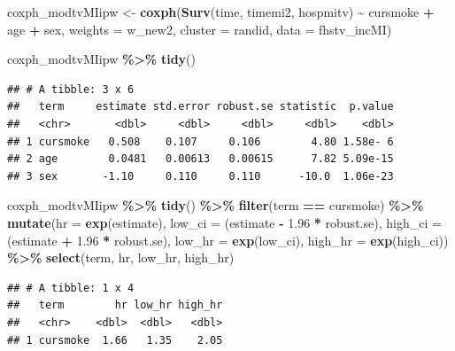 \documentclass[
]{book}
\newenvironment{Shaded}{\begin{snugshade}}{\end{snugshade}}
\newcommand{\AttributeTok}[1]{\textcolor[rgb]{0.13,0.29,0.53}{#1}}
\newcommand{\FloatTok}[1]{\textcolor[rgb]{0.00,0.00,0.81}{#1}}
\newcommand{\FunctionTok}[1]{\textcolor[rgb]{0.13,0.29,0.53}{\textbf{#1}}}
\newcommand{\NormalTok}[1]{#1}
\newcommand{\OtherTok}[1]{\textcolor[rgb]{0.56,0.35,0.01}{#1}}
\newcommand{\SpecialCharTok}[1]{\textcolor[rgb]{0.81,0.36,0.00}{\textbf{#1}}}
\newcommand{\StringTok}[1]{\textcolor[rgb]{0.31,0.60,0.02}{#1}}
\begin{document}
\begin{Shaded}
\begin{Highlighting}[]
\NormalTok{coxph\_modtvMIipw }\OtherTok{\textless{}{-}} \FunctionTok{coxph}\NormalTok{(}\FunctionTok{Surv}\NormalTok{(time, timemi2, hospmitv) }\SpecialCharTok{\textasciitilde{}} 
\NormalTok{                                cursmoke }\SpecialCharTok{+}\NormalTok{ age }\SpecialCharTok{+}\NormalTok{ sex, }
                          \AttributeTok{weights =}\NormalTok{ w\_new2, }\AttributeTok{cluster =}\NormalTok{ randid,}
                          \AttributeTok{data =}\NormalTok{ fhstv\_incMI)}

\NormalTok{coxph\_modtvMIipw }\SpecialCharTok{\%\textgreater{}\%}
  \FunctionTok{tidy}\NormalTok{()}
\end{Highlighting}
\end{Shaded}

\begin{verbatim}
## # A tibble: 3 x 6
##   term     estimate std.error robust.se statistic  p.value
##   <chr>       <dbl>     <dbl>     <dbl>     <dbl>    <dbl>
## 1 cursmoke   0.508    0.107     0.106        4.80 1.58e- 6
## 2 age        0.0481   0.00613   0.00615      7.82 5.09e-15
## 3 sex       -1.10     0.110     0.110      -10.0  1.06e-23
\end{verbatim}

\begin{Shaded}
\begin{Highlighting}[]
\NormalTok{coxph\_modtvMIipw }\SpecialCharTok{\%\textgreater{}\%} 
  \FunctionTok{tidy}\NormalTok{() }\SpecialCharTok{\%\textgreater{}\%} 
  \FunctionTok{filter}\NormalTok{(term }\SpecialCharTok{==} \StringTok{\textquotesingle{}cursmoke\textquotesingle{}}\NormalTok{) }\SpecialCharTok{\%\textgreater{}\%}
  \FunctionTok{mutate}\NormalTok{(}\AttributeTok{hr =} \FunctionTok{exp}\NormalTok{(estimate),}
         \AttributeTok{low\_ci =}\NormalTok{ (estimate }\SpecialCharTok{{-}} \FloatTok{1.96} \SpecialCharTok{*}\NormalTok{ robust.se), }
         \AttributeTok{high\_ci =}\NormalTok{ (estimate }\SpecialCharTok{+} \FloatTok{1.96} \SpecialCharTok{*}\NormalTok{ robust.se), }
         \AttributeTok{low\_hr =} \FunctionTok{exp}\NormalTok{(low\_ci), }
         \AttributeTok{high\_hr =} \FunctionTok{exp}\NormalTok{(high\_ci)) }\SpecialCharTok{\%\textgreater{}\%} 
  \FunctionTok{select}\NormalTok{(term, hr, low\_hr, high\_hr)}
\end{Highlighting}
\end{Shaded}

\begin{verbatim}
## # A tibble: 1 x 4
##   term        hr low_hr high_hr
##   <chr>    <dbl>  <dbl>   <dbl>
## 1 cursmoke  1.66   1.35    2.05
\end{verbatim}
\end{document}
